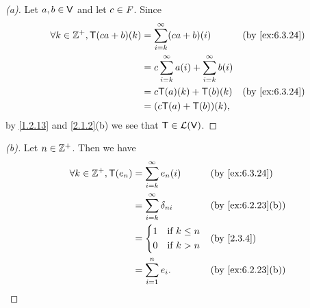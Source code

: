 \begin{proof}[(a)]
	Let \(a, b \in \mathsf{V}\) and let \(c \in \mathit{F}\).
	Since
	\begin{align*}
		\forall k \in \Z^+, \T(ca + b)(k) & = \sum_{i = k}^\infty (ca + b)(i)                       &  & \by{ex:6.3.24} \\
		                                  & = c \sum_{i = k}^\infty a(i) + \sum_{i = k}^\infty b(i)                     \\
		                                  & = c \T(a)(k) + \T(b)(k)                                 &  & \by{ex:6.3.24} \\
		                                  & = (c \T(a) + \T(b))(k),
	\end{align*}
	by \cref{1.2.13} and \cref{2.1.2}(b) we see that \(\mathsf{T} \in \mathcal{L}(\mathsf{V})\).
\end{proof}

\begin{proof}[(b)]
	Let \(n \in \mathbb{Z}^+\).
	Then we have
	\begin{align*}
		\forall k \in \Z^+, \T(e_n) & = \sum_{i = k}^\infty e_n(i)       &  & \by{ex:6.3.24}    \\
		                            & = \sum_{i = k}^\infty \delta_{n i} &  & \by{ex:6.2.23}[b] \\
		                            & = \begin{dcases}
			                                1 & \text{if } k \leq n \\
			                                0 & \text{if } k > n
		                                \end{dcases}         &  & \by{2.3.4}                    \\
		                            & = \sum_{i = 1}^n e_i.              &  & \by{ex:6.2.23}[b]
	\end{align*}
\end{proof}

